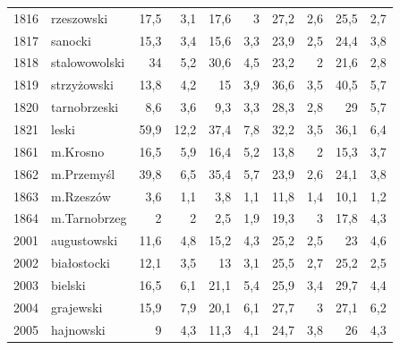 \begin{center}
\begin{longtable}{lp{3cm}rrrrrrrr}
1816 & rzeszowski              & 17,5    & 3,1         & 17,6     & 3            & 27,2     & 2,6          & 25,5     & 2,7          \\
1817 & sanocki                 & 15,3    & 3,4         & 15,6     & 3,3          & 23,9     & 2,5          & 24,4     & 3,8          \\
1818 & stalowowolski           & 34      & 5,2         & 30,6     & 4,5          & 23,2     & 2            & 21,6     & 2,8          \\
1819 & strzyżowski             & 13,8    & 4,2         & 15       & 3,9          & 36,6     & 3,5          & 40,5     & 5,7          \\
1820 & tarnobrzeski            & 8,6     & 3,6         & 9,3      & 3,3          & 28,3     & 2,8          & 29       & 5,7          \\
1821 & leski                   & 59,9    & 12,2        & 37,4     & 7,8          & 32,2     & 3,5          & 36,1     & 6,4          \\
1861 & m.Krosno                & 16,5    & 5,9         & 16,4     & 5,2          & 13,8     & 2            & 15,3     & 3,7          \\
1862 & m.Przemyśl              & 39,8    & 6,5         & 35,4     & 5,7          & 23,9     & 2,6          & 24,1     & 3,8          \\
1863 & m.Rzeszów               & 3,6     & 1,1         & 3,8      & 1,1          & 11,8     & 1,4          & 10,1     & 1,2          \\
1864 & m.Tarnobrzeg            & 2       & 2           & 2,5      & 1,9          & 19,3     & 3            & 17,8     & 4,3          \\
2001 & augustowski             & 11,6    & 4,8         & 15,2     & 4,3          & 25,2     & 2,5          & 23       & 4,6          \\
2002 & białostocki             & 12,1    & 3,5         & 13       & 3,1          & 25,5     & 2,7          & 25,2     & 2,5          \\
2003 & bielski                 & 16,5    & 6,1         & 21,1     & 5,4          & 25,9     & 3,4          & 29,7     & 4,4          \\
2004 & grajewski               & 15,9    & 7,9         & 20,1     & 6,1          & 27,7     & 3            & 27,1     & 6,2          \\
2005 & hajnowski               & 9       & 4,3         & 11,3     & 4,1          & 24,7     & 3,8          & 26       & 4,3          \\

\end{longtable}
\end{center}
